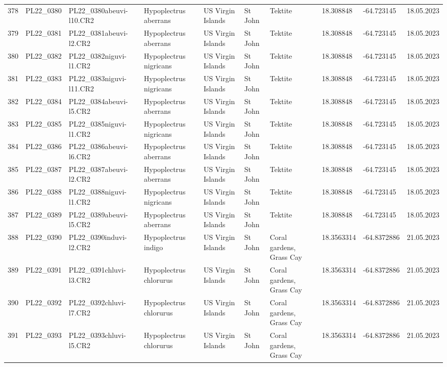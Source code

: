 \begin{table}[ht]
\begin{tabular}{rlllllllll}
  378 & PL22\_0380 & PL22\_0380abeuvi-l10.CR2 & Hypoplectrus aberrans & US Virgin Islands & St John & Tektite & 18.308848 & -64.723145 & 18.05.2023 \\ 
  379 & PL22\_0381 & PL22\_0381abeuvi-l2.CR2 & Hypoplectrus aberrans & US Virgin Islands & St John & Tektite & 18.308848 & -64.723145 & 18.05.2023 \\ 
  380 & PL22\_0382 & PL22\_0382niguvi-l1.CR2 & Hypoplectrus nigricans & US Virgin Islands & St John & Tektite & 18.308848 & -64.723145 & 18.05.2023 \\ 
  381 & PL22\_0383 & PL22\_0383niguvi-l11.CR2 & Hypoplectrus nigricans & US Virgin Islands & St John & Tektite & 18.308848 & -64.723145 & 18.05.2023 \\ 
  382 & PL22\_0384 & PL22\_0384abeuvi-l5.CR2 & Hypoplectrus aberrans & US Virgin Islands & St John & Tektite & 18.308848 & -64.723145 & 18.05.2023 \\ 
  383 & PL22\_0385 & PL22\_0385niguvi-l1.CR2 & Hypoplectrus nigricans & US Virgin Islands & St John & Tektite & 18.308848 & -64.723145 & 18.05.2023 \\ 
  384 & PL22\_0386 & PL22\_0386abeuvi-l6.CR2 & Hypoplectrus aberrans & US Virgin Islands & St John & Tektite & 18.308848 & -64.723145 & 18.05.2023 \\ 
  385 & PL22\_0387 & PL22\_0387abeuvi-l2.CR2 & Hypoplectrus aberrans & US Virgin Islands & St John & Tektite & 18.308848 & -64.723145 & 18.05.2023 \\ 
  386 & PL22\_0388 & PL22\_0388niguvi-l1.CR2 & Hypoplectrus nigricans & US Virgin Islands & St John & Tektite & 18.308848 & -64.723145 & 18.05.2023 \\ 
  387 & PL22\_0389 & PL22\_0389abeuvi-l5.CR2 & Hypoplectrus aberrans & US Virgin Islands & St John & Tektite & 18.308848 & -64.723145 & 18.05.2023 \\ 
  388 & PL22\_0390 & PL22\_0390induvi-l2.CR2 & Hypoplectrus indigo & US Virgin Islands & St John & Coral gardens, Grass Cay & 18.3563314 & -64.8372886 & 21.05.2023 \\ 
  389 & PL22\_0391 & PL22\_0391chluvi-l3.CR2 & Hypoplectrus chlorurus & US Virgin Islands & St John & Coral gardens, Grass Cay & 18.3563314 & -64.8372886 & 21.05.2023 \\ 
  390 & PL22\_0392 & PL22\_0392chluvi-l7.CR2 & Hypoplectrus chlorurus & US Virgin Islands & St John & Coral gardens, Grass Cay & 18.3563314 & -64.8372886 & 21.05.2023 \\ 
  391 & PL22\_0393 & PL22\_0393chluvi-l5.CR2 & Hypoplectrus chlorurus & US Virgin Islands & St John & Coral gardens, Grass Cay & 18.3563314 & -64.8372886 & 21.05.2023 \\ 

\end{tabular}
\end{table}
